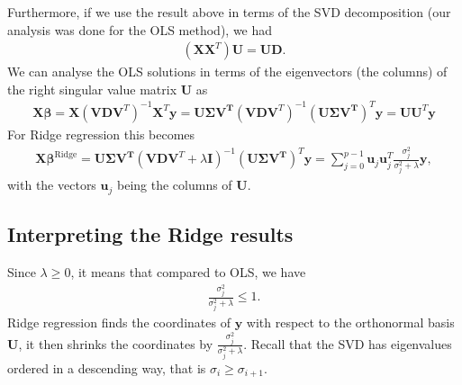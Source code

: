 \documentclass[letterpaper,10pt,english]{sphinxmanual}
\begin{document}
Furthermore, if we use the result above in terms of the SVD decomposition (our analysis was done for the OLS method), we had
\begin{equation*}
\begin{split}
(\boldsymbol{X}\boldsymbol{X}^T)\boldsymbol{U} = \boldsymbol{U}\boldsymbol{D}.
\end{split}
\end{equation*}
We can  analyse the OLS solutions in terms of the eigenvectors (the columns) of the right singular value matrix \(\boldsymbol{U}\) as
\begin{equation*}
\begin{split}
\boldsymbol{X}\boldsymbol{\beta} = \boldsymbol{X}\left(\boldsymbol{V}\boldsymbol{D}\boldsymbol{V}^T \right)^{-1}\boldsymbol{X}^T\boldsymbol{y}=\boldsymbol{U\Sigma V^T}\left(\boldsymbol{V}\boldsymbol{D}\boldsymbol{V}^T \right)^{-1}(\boldsymbol{U\Sigma V^T})^T\boldsymbol{y}=\boldsymbol{U}\boldsymbol{U}^T\boldsymbol{y}
\end{split}
\end{equation*}
For Ridge regression this becomes
\begin{equation*}
\begin{split}
\boldsymbol{X}\boldsymbol{\beta}^{\mathrm{Ridge}} = \boldsymbol{U\Sigma V^T}\left(\boldsymbol{V}\boldsymbol{D}\boldsymbol{V}^T+\lambda\boldsymbol{I} \right)^{-1}(\boldsymbol{U\Sigma V^T})^T\boldsymbol{y}=\sum_{j=0}^{p-1}\boldsymbol{u}_j\boldsymbol{u}_j^T\frac{\sigma_j^2}{\sigma_j^2+\lambda}\boldsymbol{y},
\end{split}
\end{equation*}
with the vectors \(\boldsymbol{u}_j\) being the columns of \(\boldsymbol{U}\).


\subsection{Interpreting the Ridge results}
\label{\detokenize{chapter4:interpreting-the-ridge-results}}
Since \(\lambda \geq 0\), it means that compared to OLS, we have
\begin{equation*}
\begin{split}
\frac{\sigma_j^2}{\sigma_j^2+\lambda} \leq 1.
\end{split}
\end{equation*}
Ridge regression finds the coordinates of \(\boldsymbol{y}\) with respect to the
orthonormal basis \(\boldsymbol{U}\), it then shrinks the coordinates by
\(\frac{\sigma_j^2}{\sigma_j^2+\lambda}\). Recall that the SVD has
eigenvalues ordered in a descending way, that is \(\sigma_i \geq
\sigma_{i+1}\).
\end{document}

